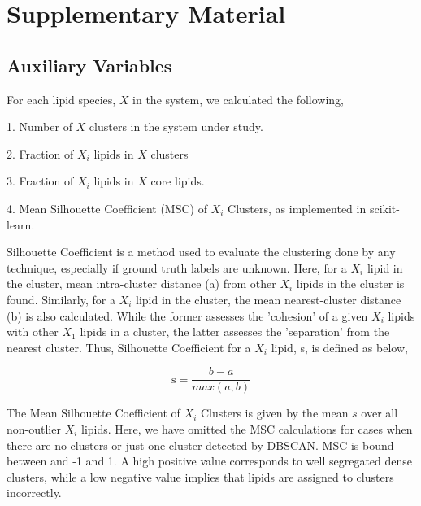 \documentclass{biophys-new}
\begin{document}
\section*{Supplementary Material}

\subsection*{Auxiliary Variables}

For each lipid species, $X$ in the system, we calculated the following, 

1. Number of $X$ clusters in the system under study.

2. Fraction of $X_i$ lipids in $X$ clusters

3. Fraction of $X_i$ lipids in $X$ core lipids.

4. Mean Silhouette Coefficient (MSC) of $X_i$ Clusters, as implemented in scikit-learn.

Silhouette Coefficient is a method used to evaluate the clustering done by any technique, especially if ground truth labels are unknown. 
Here, for a $X_i$ lipid in the cluster, mean intra-cluster distance (a) from other $X_i$ lipids in the cluster is found.  
Similarly, for a $X_i$ lipid in the cluster, the mean nearest-cluster distance (b) is also calculated.
While the former assesses the 'cohesion' of a given $X_i$ lipids with other $X_1$ lipids in a cluster, the latter assesses the 'separation' from the nearest cluster.
Thus, Silhouette Coefficient for a $X_i$ lipid, s, is defined as below,

\begin{equation}
\label{eq:SC}
\text{s} = \frac{b - a}{max(a,b)}
\end{equation}

The Mean Silhouette Coefficient of $X_i$ Clusters is given by the mean $s$ over all non-outlier $X_i$ lipids.
Here, we have omitted the MSC calculations for cases when there are no clusters or just one cluster detected by DBSCAN. 
MSC is bound between and -1 and 1.
A high positive value corresponds to well segregated dense clusters, while a low negative value implies that lipids are assigned to clusters incorrectly.  
\end{document}
